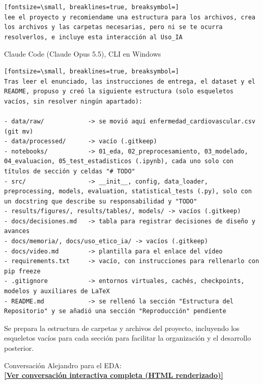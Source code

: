\documentclass[12pt,a4paper,oneside]{book}
\begin{document}
\begin{iaprompt}
\begin{Verbatim}[fontsize=\small, breaklines=true, breaksymbol=]
lee el proyecto y recomiendame una estructura para los archivos, crea los archivos y las carpetas necesarias, pero ni se te ocurra resolverlos, e incluye esta interacción al Uso_IA
\end{Verbatim}
\end{iaprompt}
\begin{iaresp}{Claude Code (Claude Opus 5.5), CLI en Windows}
\begin{Verbatim}[fontsize=\small, breaklines=true, breaksymbol=]
Tras leer el enunciado, las instrucciones de entrega, el dataset y el README, propuso y creó la siguiente estructura (solo esqueletos vacíos, sin resolver ningún apartado):

- data/raw/            -> se movió aquí enfermedad_cardiovascular.csv (git mv)
- data/processed/      -> vacío (.gitkeep)
- notebooks/           -> 01_eda, 02_preprocesamiento, 03_modelado, 04_evaluacion, 05_test_estadisticos (.ipynb), cada uno solo con títulos de sección y celdas "# TODO"
- src/                 -> __init__, config, data_loader, preprocessing, models, evaluation, statistical_tests (.py), solo con un docstring que describe su responsabilidad y "TODO"
- results/figures/, results/tables/, models/ -> vacíos (.gitkeep)
- docs/decisiones.md   -> tabla para registrar decisiones de diseño y avances
- docs/memoria/, docs/uso_etico_ia/ -> vacíos (.gitkeep)
- docs/video.md        -> plantilla para el enlace del vídeo
- requirements.txt     -> vacío, con instrucciones para rellenarlo con pip freeze
- .gitignore           -> entornos virtuales, cachés, checkpoints, modelos y auxiliares de LaTeX
- README.md            -> se rellenó la sección "Estructura del Repositorio" y se añadió una sección "Reproducción" pendiente
\end{Verbatim}
\end{iaresp}
\begin{iaanalisis}
Se prepara la estructura de carpetas y archivos del proyecto, incluyendo los esqueletos vacíos para cada sección para facilitar la organización y el desarrollo posterior. 
\end{iaanalisis}



Conversación Alejandro para el EDA: \\
\href{https://htmlpreview.github.io/?https://github.com/madalenointhemorning/MachineLearningUMU/blob/main/docs/conversacionesIA/RecopilatorioConsultasEDA1.html}{\textbf{[Ver conversación interactiva completa (HTML renderizado)]}}
\end{document}
